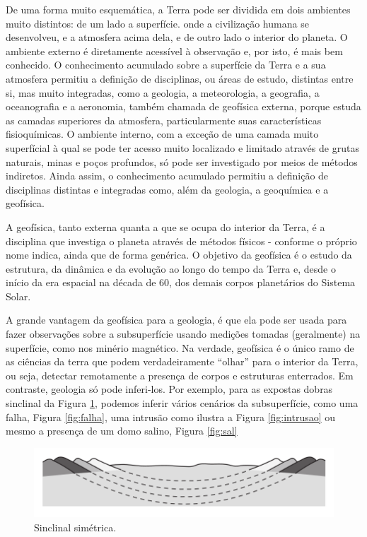 \documentclass[]{book}
\theoremstyle{definition}
\theoremstyle{definition}
\theoremstyle{definition}
\theoremstyle{remark}
\begin{document}
De uma forma muito esquemática, a Terra pode ser dividida em dois ambientes muito distintos: de um lado a superfície. onde a civilização humana se desenvolveu, e a atmosfera acima dela, e de outro lado o interior do planeta. O ambiente externo é diretamente acessível à observação e, por isto, é mais bem conhecido. O conhecimento acumulado sobre a superfície da Terra e a sua atmosfera permitiu a definição de disciplinas, ou áreas de estudo, distintas entre si, mas muito integradas, como a geologia, a meteorologia, a geografia, a oceanografia e a aeronomia, também chamada de geofísica externa, porque estuda as camadas superiores da atmosfera, particularmente suas características fisioquímicas. O ambiente interno, com a exceção de uma camada muito superfícial à qual se pode ter acesso muito localizado e limitado através de grutas naturais, minas e poços profundos, só pode ser investigado por meios de métodos indiretos. Ainda assim, o conhecimento acumulado permitiu a definição de disciplinas distintas e integradas como, além da geologia, a geoquímica e a geofísica.

A geofísica, tanto externa quanta a que se ocupa do interior da Terra, é a disciplina que investiga o planeta através de métodos físicos - conforme o próprio nome indica, ainda que de forma genérica. O objetivo da geofísica é o estudo da estrutura, da dinâmica e da evolução ao longo do tempo da Terra e, desde o início da era espacial na década de 60, dos demais corpos planetários do Sistema Solar.

A grande vantagem da geofísica para a geologia, é que ela pode ser usada para fazer observações sobre a subsuperfície usando medições tomadas (geralmente) na superfície, como nos minério magnético. Na verdade, geofísica é o único ramo de as ciências da terra que podem verdadeiramente ``olhar'' para o interior da Terra, ou seja, detectar remotamente a presença de corpos e estruturas enterrados. Em contraste, geologia só pode inferi-los. Por exemplo, para as expostas dobras sinclinal da Figura \ref{fig:sinclinal}, podemos inferir vários cenários da subsuperfície, como uma falha, Figura \ref{fig:falha}, uma intrusão como ilustra a Figura \ref{fig:intrusao} ou mesmo a presença de um domo salino, Figura \ref{fig:sal}

\begin{figure}

{\centering \includegraphics[width=0.7\linewidth]{fig/Fig_01.01} 

}

\caption{Sinclinal simétrica.}\label{fig:sinclinal}
\end{figure}
\end{document}
